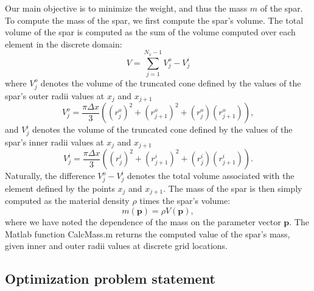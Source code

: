 \documentclass[11pt]{article}
\newcommand{\bs}[1] {\boldsymbol{#1}}
\begin{document}
Our main objective is to minimize the weight, and thus
the mass $m$ of the spar. To compute the mass of the
spar, we first compute the spar's volume. The total volume
of the spar is computed as the sum of the volume computed
over each element in the discrete domain:
\begin{equation}
V = \sum^{N_x-1}_{j=1} V^o_j - V^i_j
\end{equation}
where $V^o_j$ denotes the volume of the truncated cone
defined by the values of the spar's outer
radii values at $x_j$ and $x_{j+1}$
\begin{equation}
V^o_j = \frac{\pi \Delta x}{3} ((r^o_j)^2 + (r^o_{j+1})^2 + (r^o_j)(r^o_{j+1})),
\end{equation}
and $V^i_j$ denotes the volume of the truncated cone
defined by the values of the spar's inner
radii values at $x_j$ and $x_{j+1}$
\begin{equation}
V^i_j = \frac{\pi \Delta x}{3} ((r^i_j)^2 + (r^i_{j+1})^2 + (r^i_j) (r^i_{j+1})).
\end{equation}
Naturally, the difference $V^o_j-V^i_j$ denotes the
total volume associated with the element defined
by the points $x_j$ and $x_{j+1}$.
The mass of the spar is then simply computed
as the material density $\rho$ times the spar's volume:
\begin{equation}
m(\bs{p}) =  \rho V(\bs{p}),
\end{equation}
where we have noted the dependence of the mass on the parameter
vector $\bs{p}$. The Matlab
function CalcMass.m returns the computed value
of the spar's mass, given inner and outer radii
values at discrete grid locations.

\subsection{Optimization problem statement}
\end{document}
